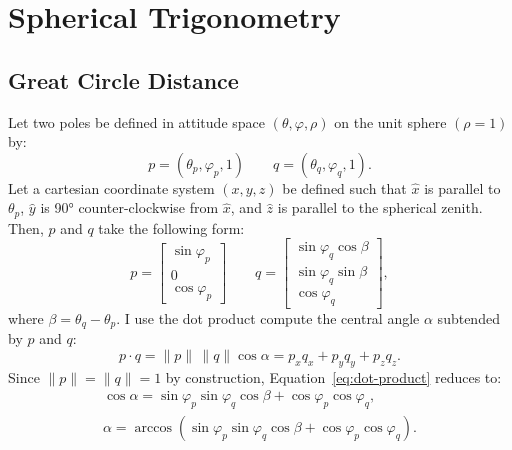 \chapter{Spherical Trigonometry}\label{app:spherical-trig}
\section{Great Circle Distance}\label{app:gcd}
Let two poles be defined in attitude space $(\theta,\varphi,\rho)$ on the unit sphere $(\rho=1)$ by:
\begin{equation}
    p=(\theta_p,\varphi_p,1)\qquad q=(\theta_q,\varphi_q,1).
\end{equation}
Let a cartesian coordinate system $(x,y,z)$ be defined such that $\hat x$ is parallel to $\theta_p$, $\hat y$ is \ang{90} counter-clockwise from $\hat x$, and $\hat z$ is parallel to the spherical zenith. Then, $p$ and $q$ take the following form: %
\begin{equation}
    p=
    \begin{bmatrix}
        \sin\varphi_p\\
        0\\
        \cos\varphi_p
    \end{bmatrix}
    \qquad
    q=
    \begin{bmatrix}
        \sin\varphi_q\cos\beta\\
        \sin\varphi_q\sin\beta\\
        \cos\varphi_q
    \end{bmatrix},
\end{equation}
where $\beta=\theta_q-\theta_p$. I use the dot product compute the central angle $\alpha$ subtended by $p$ and $q$:
\begin{equation}
    p\cdot q
    =\|p\|\,\|q\|\cos\alpha
    =p_{x}q_{x}
    +p_{y}q_{y}
    +p_{z}q_{z}.\label{eq:dot-product}
\end{equation}
Since $\|p\|=\|q\|=1$ by construction, Equation~\eqref{eq:dot-product} reduces to:
\begin{gather}
    \cos\alpha
    =\sin\varphi_p\sin\varphi_q\cos\beta
    +\cos\varphi_p\cos\varphi_q,\nonumber\\
    \alpha
    =\arccos(\sin\varphi_p\sin\varphi_q\cos\beta
    +\cos\varphi_p\cos\varphi_q).
\end{gather}

